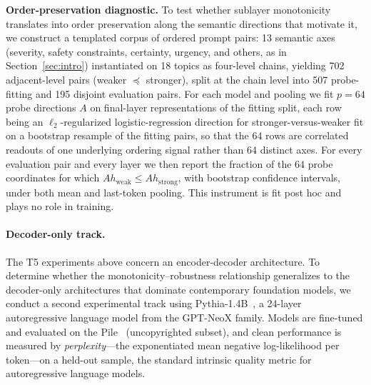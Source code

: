 \documentclass{article}
\theoremstyle{plain}
\theoremstyle{definition}
\theoremstyle{remark}
\theoremstyle{plain}
\begin{document}
\textbf{Order-preservation diagnostic.}
To test whether sublayer monotonicity translates into order preservation along the semantic directions that motivate it, we construct a templated corpus of ordered prompt pairs: 13 semantic axes (severity, safety constraints, certainty, urgency, and others, as in Section~\ref{sec:intro}) instantiated on 18 topics as four-level chains, yielding 702 adjacent-level pairs (weaker $\preceq$ stronger), split at the chain level into 507 probe-fitting and 195 disjoint evaluation pairs. For each model and pooling we fit $p=64$ probe directions $A$ on final-layer representations of the fitting split, each row being an $\ell_2$-regularized logistic-regression direction for stronger-versus-weaker fit on a bootstrap resample of the fitting pairs, so that the 64 rows are correlated readouts of one underlying ordering signal rather than 64 distinct axes. For every evaluation pair and every layer we then report the fraction of the $64$ probe coordinates for which $A h_{\mathrm{weak}} \le A h_{\mathrm{strong}}$, with bootstrap confidence intervals, under both mean and last-token pooling. This instrument is fit post hoc and plays no role in training.


\paragraph{Decoder-only track.}
The T5 experiments above concern an encoder-decoder architecture. To determine whether the monotonicity--robustness relationship generalizes to the decoder-only architectures that dominate contemporary foundation models, we conduct a second experimental track using Pythia-1.4B~\citep{biderman2023pythia}, a 24-layer autoregressive language model from the GPT-NeoX family. Models are fine-tuned and evaluated on the Pile~\citep{gao2020pile} (uncopyrighted subset), and clean performance is measured by \emph{perplexity}---the exponentiated mean negative log-likelihood per token---on a held-out sample, the standard intrinsic quality metric for autoregressive language models.
\end{document}
